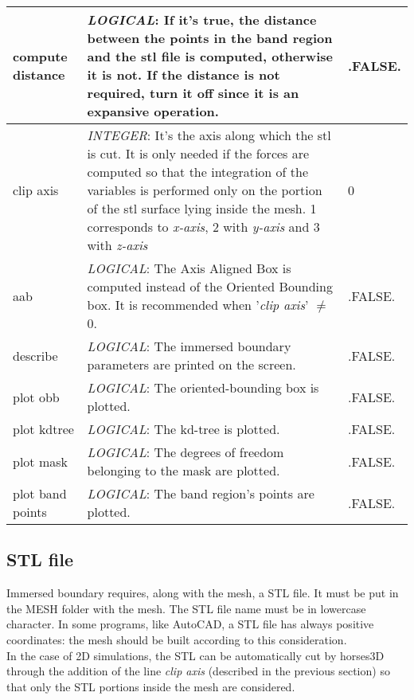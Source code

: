 \documentclass[a4paper,10pt]{report}
\begin{document}
\begin{longtable}{|p{4cm}|p{10cm}|p{2.2cm}|}
compute distance & \textit{LOGICAL}: If it's true, the distance between the points in the band region and the stl file is computed, otherwise it is not. If the distance is not required, turn it off since it is an expansive operation. & .FALSE. \\ \hline

clip axis  & \textit{INTEGER}: It's the axis along which the stl is cut. It is only needed if the forces are computed so that the integration of the variables is performed only on the portion of the stl surface lying inside the mesh. 1 corresponds to \textit{x-axis}, 2 with \textit{y-axis} and 3 with \textit{z-axis}&  0 \\ \hline

aab  & \textit{LOGICAL}: The Axis Aligned Box is computed instead of the Oriented Bounding box. It is recommended when '\textit{clip axis}' $\ne$ 0. & .FALSE. \\ \hline

describe & \textit{LOGICAL}: The immersed boundary parameters are printed on the screen. & .FALSE. \\ \hline

plot obb & \textit{LOGICAL}: The oriented-bounding box is plotted. & .FALSE. \\ \hline

plot kdtree & \textit{LOGICAL}: The kd-tree is plotted. & .FALSE. \\ \hline

plot mask & \textit{LOGICAL}: The degrees of freedom belonging to the mask are plotted. & .FALSE. \\ \hline

plot band points & \textit{LOGICAL}: The band region's points are plotted. & .FALSE. \\ \hline

\end{longtable}


\subsection{STL file}

Immersed boundary requires, along with the mesh, a STL file. It must be put in the MESH folder with the mesh. The STL file name must be in lowercase character. In some programs, like AutoCAD, a STL file has always positive coordinates: the mesh should be built according to this consideration.\\
In the case of 2D simulations, the STL can be automatically cut by horses3D through the addition of the line \textit{clip axis} (described in the previous section) so that only the STL portions inside the mesh are considered.
\end{document}
